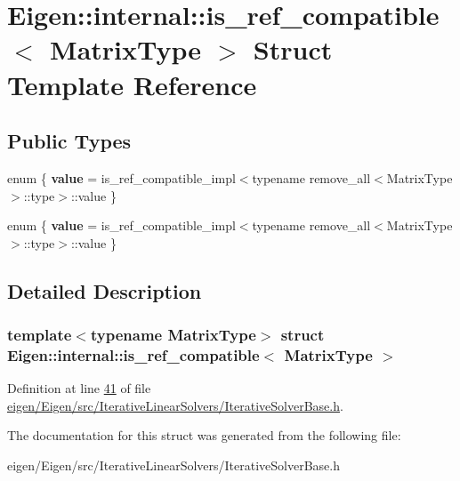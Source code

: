 \hypertarget{struct_eigen_1_1internal_1_1is__ref__compatible}{}\section{Eigen\+:\+:internal\+:\+:is\+\_\+ref\+\_\+compatible$<$ Matrix\+Type $>$ Struct Template Reference}
\label{struct_eigen_1_1internal_1_1is__ref__compatible}
\subsection*{Public Types}
\begin{DoxyCompactItemize}
\item 
\mbox{\label{struct_eigen_1_1internal_1_1is__ref__compatible_af85308b4c2bde87a17397a6c2b6e9c4f}} 
enum \{ {\bfseries value} = is\+\_\+ref\+\_\+compatible\+\_\+impl$<$typename remove\+\_\+all$<$Matrix\+Type$>$\+:\+:type$>$\+:\+:value
 \}
\item 
\mbox{\label{struct_eigen_1_1internal_1_1is__ref__compatible_a3096b15da0389e28e1861cde8af3cbdf}} 
enum \{ {\bfseries value} = is\+\_\+ref\+\_\+compatible\+\_\+impl$<$typename remove\+\_\+all$<$Matrix\+Type$>$\+:\+:type$>$\+:\+:value
 \}
\end{DoxyCompactItemize}


\subsection{Detailed Description}
\subsubsection*{template$<$typename Matrix\+Type$>$\newline
struct Eigen\+::internal\+::is\+\_\+ref\+\_\+compatible$<$ Matrix\+Type $>$}



Definition at line \hyperlink{eigen_2_eigen_2src_2_iterative_linear_solvers_2_iterative_solver_base_8h_source_l00041}{41} of file \hyperlink{eigen_2_eigen_2src_2_iterative_linear_solvers_2_iterative_solver_base_8h_source}{eigen/\+Eigen/src/\+Iterative\+Linear\+Solvers/\+Iterative\+Solver\+Base.\+h}.



The documentation for this struct was generated from the following file\+:\begin{DoxyCompactItemize}
\item 
eigen/\+Eigen/src/\+Iterative\+Linear\+Solvers/\+Iterative\+Solver\+Base.\+h\end{DoxyCompactItemize}
